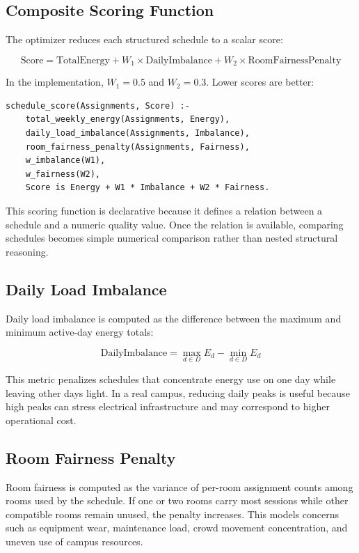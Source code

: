 \documentclass[12pt,a4paper]{article}
\begin{document}
\subsection{Composite Scoring Function}

The optimizer reduces each structured schedule to a scalar score:

\[
    \text{Score} =
    \text{TotalEnergy}
    + W_1 \times \text{DailyImbalance}
    + W_2 \times \text{RoomFairnessPenalty}
\]

In the implementation, \(W_1 = 0.5\) and \(W_2 = 0.3\). Lower scores are better:

\begin{lstlisting}[caption={Multi-criteria schedule score}]
schedule_score(Assignments, Score) :-
    total_weekly_energy(Assignments, Energy),
    daily_load_imbalance(Assignments, Imbalance),
    room_fairness_penalty(Assignments, Fairness),
    w_imbalance(W1),
    w_fairness(W2),
    Score is Energy + W1 * Imbalance + W2 * Fairness.
\end{lstlisting}

This scoring function is declarative because it defines a relation between a schedule and a numeric quality value. Once the relation is available, comparing schedules becomes simple numerical comparison rather than nested structural reasoning.

\subsection{Daily Load Imbalance}

Daily load imbalance is computed as the difference between the maximum and minimum active-day energy totals:

\[
    \text{DailyImbalance} =
    \max_{d \in D} E_d - \min_{d \in D} E_d
\]

This metric penalizes schedules that concentrate energy use on one day while leaving other days light. In a real campus, reducing daily peaks is useful because high peaks can stress electrical infrastructure and may correspond to higher operational cost.

\subsection{Room Fairness Penalty}

Room fairness is computed as the variance of per-room assignment counts among rooms used by the schedule. If one or two rooms carry most sessions while other compatible rooms remain unused, the penalty increases. This models concerns such as equipment wear, maintenance load, crowd movement concentration, and uneven use of campus resources.
\end{document}
